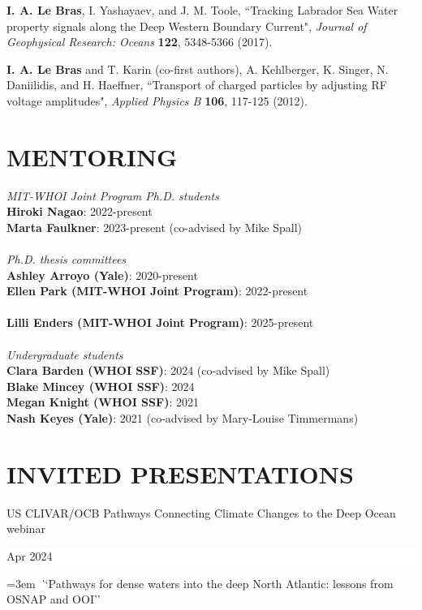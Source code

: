 \documentclass[paper=letter,fontsize=11pt]{scrartcl} %
\newcommand{\sepspace}{\vspace*{3mm}}		%
\newcommand{\NewPart}[2]{\section*{\uppercase{#1} #2}}
\newcommand{\ShortEntry}[2]{\normalsize \noindent \textbf{#1}: #2 \\ }
\newcommand{\PaperEntry}[6]{
		\noindent #1, ``#2", \textit{#3} \textbf{#4}, #5 (#6).}
\newcommand{\TalkEntry}[3]{
		\noindent #1 \hfill      %
		\colorbox{White}{%
			\parbox{6em}{%
			\hfill\color{Black}#2}} \par  %
		\noindent\hangindent=3em\hangafter=0 \textit ``#3''\sepspace} %
\begin{document}
\begin{etaremune}
\item \PaperEntry{\textbf{I. A. Le Bras}, I. Yashayaev, and J. M. Toole}{Tracking Labrador Sea Water property signals along the Deep Western Boundary Current}{ Journal of Geophysical Research: Oceans}{122}{5348-5366}{2017}

\item \PaperEntry{\textbf{I. A. Le Bras} and T. Karin (co-first authors), A. Kehlberger, K. Singer, N. Daniilidis, and H. Haeffner}{Transport of charged particles by adjusting RF voltage amplitudes}{Applied Physics B}{106}{117-125}{2012}

\end{etaremune}



\NewPart{Mentoring}{}


\emph{MIT-WHOI Joint Program Ph.D. students}\\
\ShortEntry{Hiroki Nagao}{2022-present}
\ShortEntry{Marta Faulkner}{2023-present (co-advised by Mike Spall)}\\
\emph{Ph.D. thesis committees}\\
\ShortEntry{Ashley Arroyo (Yale)}{2020-present}
\ShortEntry{Ellen Park (MIT-WHOI Joint Program)}{2022-present}\\
\ShortEntry{Lilli Enders (MIT-WHOI Joint Program)}{2025-present}\\
\emph{Undergraduate students}\\
\ShortEntry{Clara Barden (WHOI SSF)}{2024 (co-advised by Mike Spall)}
\ShortEntry{Blake Mincey (WHOI SSF)}{2024}
\ShortEntry{Megan Knight (WHOI SSF)}{2021}
\ShortEntry{Nash Keyes (Yale)}{2021  (co-advised by Mary-Louise Timmermans)}

\NewPart{Invited presentations}{}

\TalkEntry{US CLIVAR/OCB Pathways Connecting Climate Changes to the Deep Ocean webinar}{Apr 2024}{Pathways for dense waters into the deep North Atlantic: lessons from OSNAP and OOI}
\end{document}
